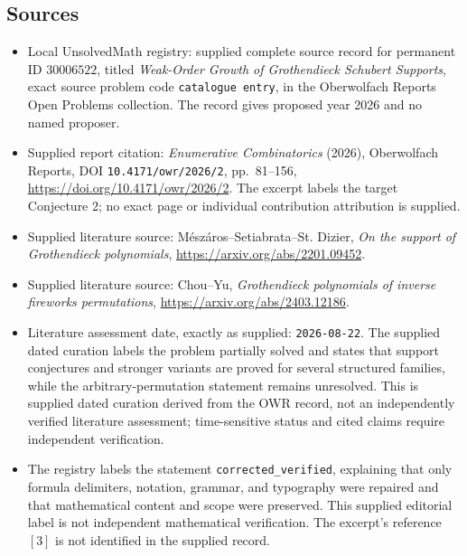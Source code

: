 \documentclass[11pt]{article}
\begin{document}
\subsection{Sources}
\begin{itemize}
\item Local UnsolvedMath registry: supplied complete source record for permanent ID \(30006522\), titled \emph{Weak-Order Growth of Grothendieck Schubert Supports}, exact source problem code \texttt{catalogue entry}, in the Oberwolfach Reports Open Problems collection. The record gives proposed year 2026 and no named proposer.
\item Supplied report citation: \emph{Enumerative Combinatorics} (2026), Oberwolfach Reports, DOI \texttt{10.4171/owr/2026/2}, pp.~81--156, \url{https://doi.org/10.4171/owr/2026/2}. The excerpt labels the target Conjecture 2; no exact page or individual contribution attribution is supplied.
\item Supplied literature source: Mészáros--Setiabrata--St. Dizier, \emph{On the support of Grothendieck polynomials}, \url{https://arxiv.org/abs/2201.09452}.
\item Supplied literature source: Chou--Yu, \emph{Grothendieck polynomials of inverse fireworks permutations}, \url{https://arxiv.org/abs/2403.12186}.
\item Literature assessment date, exactly as supplied: \texttt{2026-08-22}. The supplied dated curation labels the problem partially solved and states that support conjectures and stronger variants are proved for several structured families, while the arbitrary-permutation statement remains unresolved. This is supplied dated curation derived from the OWR record, not an independently verified literature assessment; time-sensitive status and cited claims require independent verification.
\item The registry labels the statement \texttt{corrected\_verified}, explaining that only formula delimiters, notation, grammar, and typography were repaired and that mathematical content and scope were preserved. This supplied editorial label is not independent mathematical verification. The excerpt's reference \([3]\) is not identified in the supplied record.
\end{itemize}
\end{document}
